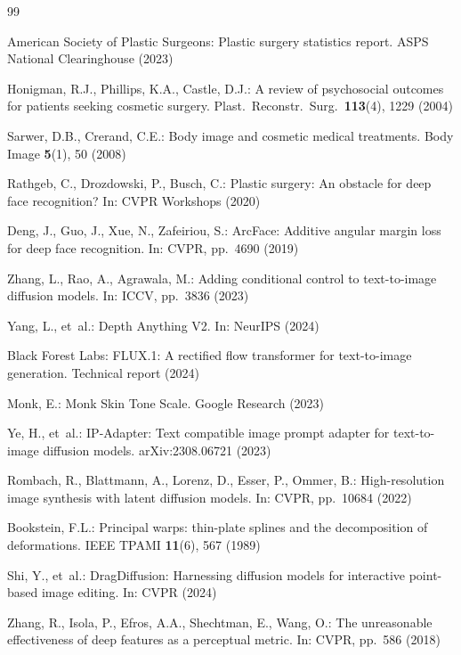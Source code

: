 \documentclass[runningheads]{llncs}
\begin{document}
\begin{thebibliography}{99}

American Society of Plastic Surgeons:
Plastic surgery statistics report.
ASPS National Clearinghouse (2023)

Honigman, R.J., Phillips, K.A., Castle, D.J.:
A review of psychosocial outcomes for patients seeking cosmetic surgery.
Plast.\ Reconstr.\ Surg.\ \textbf{113}(4), 1229 (2004)

Sarwer, D.B., Crerand, C.E.:
Body image and cosmetic medical treatments.
Body Image \textbf{5}(1), 50 (2008)

Rathgeb, C., Drozdowski, P., Busch, C.:
Plastic surgery: An obstacle for deep face recognition?
In: CVPR Workshops (2020)

Deng, J., Guo, J., Xue, N., Zafeiriou, S.:
ArcFace: Additive angular margin loss for deep face recognition.
In: CVPR, pp.~4690 (2019)

Zhang, L., Rao, A., Agrawala, M.:
Adding conditional control to text-to-image diffusion models.
In: ICCV, pp.~3836 (2023)

Yang, L., et~al.:
Depth Anything V2.
In: NeurIPS (2024)

Black Forest Labs:
FLUX.1: A rectified flow transformer for text-to-image generation.
Technical report (2024)

Monk, E.:
Monk Skin Tone Scale.
Google Research (2023)

Ye, H., et~al.:
IP-Adapter: Text compatible image prompt adapter for text-to-image diffusion
models.
arXiv:2308.06721 (2023)

Rombach, R., Blattmann, A., Lorenz, D., Esser, P., Ommer, B.:
High-resolution image synthesis with latent diffusion models.
In: CVPR, pp.~10684 (2022)

Bookstein, F.L.:
Principal warps: thin-plate splines and the decomposition of deformations.
IEEE TPAMI \textbf{11}(6), 567 (1989)

Shi, Y., et~al.:
DragDiffusion: Harnessing diffusion models for interactive point-based
image editing.
In: CVPR (2024)

Zhang, R., Isola, P., Efros, A.A., Shechtman, E., Wang, O.:
The unreasonable effectiveness of deep features as a perceptual metric.
In: CVPR, pp.~586 (2018)


\end{thebibliography}
\end{document}
